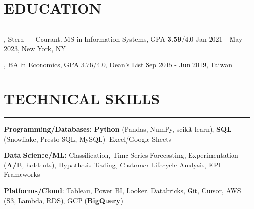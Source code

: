 \documentclass[11pt,letterpaper]{article}
\begin{document}
\section*{EDUCATION}
\vspace{-8pt}\noindent\rule{\textwidth}{0.8pt}

\vspace{2pt}
, Stern --- Courant, MS in Information Systems, GPA \textbf{3.59}/4.0 \hfill Jan 2021 - May 2023, New York, NY

\vspace{2pt}
, BA in Economics, GPA 3.76/4.0, Dean's List \hfill Sep 2015 - Jun 2019, Taiwan

\vspace{0.35\baselineskip}
\section*{TECHNICAL SKILLS}
\vspace{-8pt}\noindent\rule{\textwidth}{0.8pt}

\vspace{2pt}
\noindent\textbf{Programming/Databases:} \textbf{Python} (Pandas, NumPy, scikit-learn), \textbf{SQL} (Snowflake, Presto SQL, MySQL), Excel/Google Sheets

\vspace{2pt}
\noindent\textbf{Data Science/ML:} Classification, Time Series Forecasting, Experimentation (\textbf{A/B}, holdouts), Hypothesis Testing, Customer Lifecycle Analysis, KPI Frameworks

\vspace{2pt}
\noindent\textbf{Platforms/Cloud:} Tableau, Power BI, Looker, Databricks, Git, Cursor, AWS (S3, Lambda, RDS), GCP (\textbf{BigQuery})

\vspace{2pt}
\end{document}
